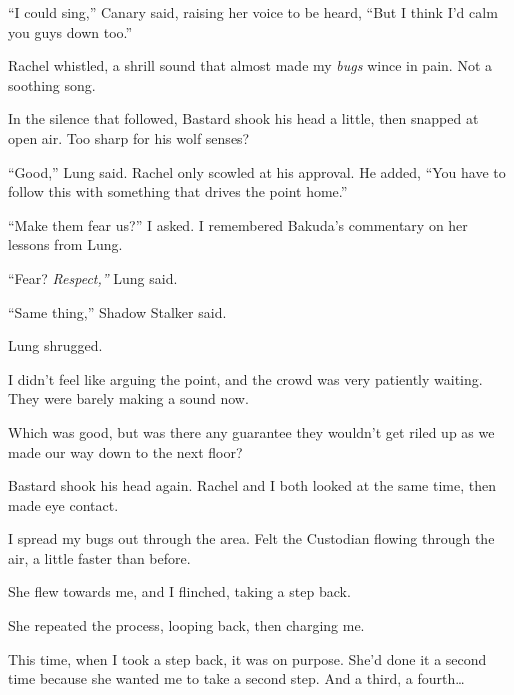 ``I could sing,'' Canary said, raising her voice to be heard, ``But I think I'd calm you guys down too.''



Rachel whistled, a shrill sound that almost made my \emph{bugs} wince in pain.  Not a soothing song.



In the silence that followed, Bastard shook his head a little, then snapped at open air.  Too sharp for his wolf senses?



``Good,'' Lung said.  Rachel only scowled at his approval.  He added, ``You have to follow this with something that drives the point home.''



``Make them fear us?'' I asked.  I remembered Bakuda's commentary on her lessons from Lung.



``Fear?  \emph{Respect,'' }Lung said.



``Same thing,'' Shadow Stalker said.



Lung shrugged.



I didn't feel like arguing the point, and the crowd was very patiently waiting.  They were barely making a sound now.



Which was good, but was there any guarantee they wouldn't get riled up as we made our way down to the next floor?



Bastard shook his head again.  Rachel and I both looked at the same time, then made eye contact.



I spread my bugs out through the area.  Felt the Custodian flowing through the air, a little faster than before.



She flew towards me, and I flinched, taking a step back.



She repeated the process, looping back, then charging me.



This time, when I took a step back, it was on purpose.  She'd done it a second time because she wanted me to take a second step.  And a third, a fourth\ldots



